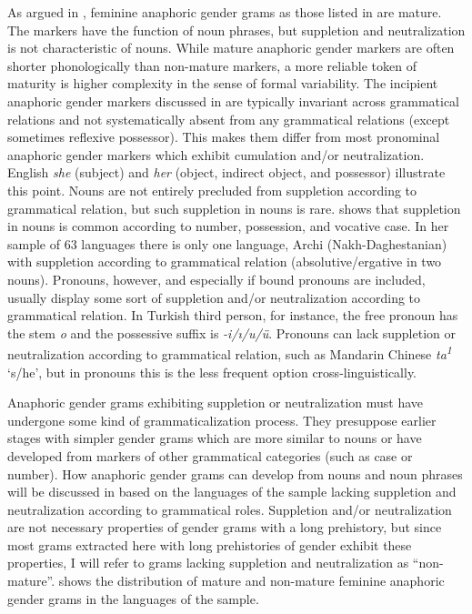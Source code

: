 \documentclass[output=collectionpaper]{langsci/langscibook}
\begin{document}
As argued in , feminine anaphoric gender grams as those listed in  are mature. The markers have the function of noun phrases, but suppletion and neutralization is not characteristic of nouns. While mature anaphoric gender markers are often shorter phonologically than non-mature markers, a more reliable token of maturity is higher complexity in the sense of formal variability. The incipient anaphoric gender markers discussed in  are typically invariant across grammatical relations and not systematically absent from any grammatical relations (except sometimes reflexive possessor). This makes them differ from most pronominal anaphoric gender markers which exhibit cumulation and/or neutralization. English \textit{she} (subject) and \textit{her} (object, indirect object, and possessor) illustrate this point. Nouns are not entirely precluded from suppletion according to grammatical relation, but such suppletion in nouns is rare. \citet{Vafaeian2013} shows that suppletion in nouns is common according to number, possession, and vocative case. In her sample of 63 languages there is only one language, Archi (Nakh-Daghestanian) with suppletion according to grammatical relation (absolutive/ergative in two nouns). Pronouns, however, and especially if bound pronouns are included, usually display some sort of suppletion and/or neutralization according to grammatical relation. In Turkish third person, for instance, the free pronoun has the stem \textit{o} and the possessive suffix is \textit{-i/ı/u/ü}. Pronouns can lack suppletion or neutralization according to grammatical relation, such as Mandarin Chinese \textit{ta\textsuperscript{1}} ‘s/he’, but in pronouns this is the less frequent option cross-linguistically.

Anaphoric gender grams exhibiting suppletion or neutralization must have undergone some kind of grammaticalization process. They presuppose earlier stages with simpler gender grams which are more similar to nouns or have developed from markers of other grammatical categories (such as case or number). How anaphoric gender grams can develop from nouns and noun phrases will be discussed in  based on the languages of the sample lacking suppletion and neutralization according to grammatical roles. Suppletion and/or neutralization are not necessary properties of gender grams with a long prehistory, but since most grams extracted here with long prehistories of gender exhibit these properties, I will refer to grams lacking suppletion and neutralization as “non-mature”.  shows the distribution of mature and non-mature feminine anaphoric gender grams in the languages of the sample.
\end{document}

